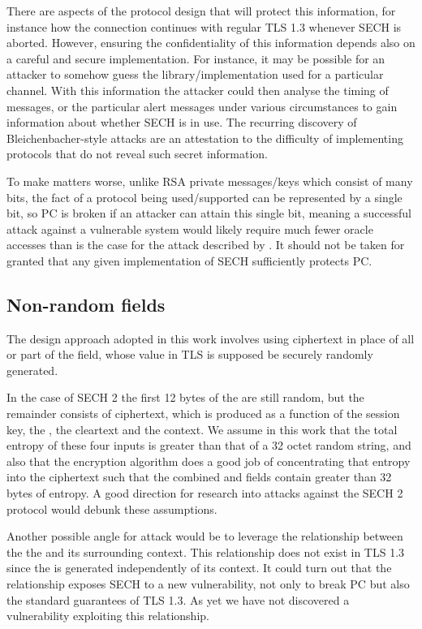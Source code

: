 There are aspects of the protocol design that will protect this information, for instance how the connection continues with regular \ac{TLS} 1.3 whenever \ac{SECH} is aborted.
However, ensuring the confidentiality of this information depends also on
a careful and secure implementation. For instance, it may be possible for an attacker to somehow guess the library/implementation used for a particular channel.
With this information the attacker could then analyse the timing of messages, or the particular alert messages under various circumstances to gain information about whether \ac{SECH} is in use.
The recurring discovery of Bleichenbacher-style attacks \citep{ronen2019ninelivesbleichenbacher} are an attestation to the difficulty of implementing protocols that do not reveal such secret information.

To make matters worse, unlike \ac{RSA} private messages/keys which consist of many bits, the fact of a protocol being used/supported can be represented by a single bit, so \ac{PC} is broken if an attacker can attain this single bit, meaning a successful attack against a vulnerable system would likely require much fewer oracle accesses than is the case for the attack described by \cite{bleichenbacher1998chosen}. It should not be taken for granted that any given implementation of \ac{SECH} sufficiently protects \ac{PC}.

\subsection{Non-random  fields}
The design approach adopted in this work involves
using ciphertext in place of all or part of the 
 field, whose value in \ac{TLS} is
supposed be securely randomly generated.

In the case of \ac{SECH} 2 the first 12 bytes of the 
are still random, but the remainder consists of
ciphertext, which is produced as a function of the session key,
the \nonce, the cleartext and the context.
We assume in this work that the total entropy of these
four inputs is greater than that of a 32 octet random string,
and also that the encryption algorithm does a good job of
concentrating that entropy into the ciphertext such that the
combined  and \varlegacysessionid{} fields contain
greater than 32 bytes of entropy.
A good direction for research into attacks against the \ac{SECH} 2
protocol would debunk these assumptions.

Another possible angle for attack would be to leverage
the relationship between the the  and its
surrounding context.
This relationship does not exist in \ac{TLS} 1.3
since the  is generated independently of its context.
It could turn out that the relationship exposes \ac{SECH}
to a new vulnerability, not only to break \ac{PC}
but also the standard guarantees of \ac{TLS} 1.3.
As yet we have not discovered a vulnerability exploiting this
relationship.



